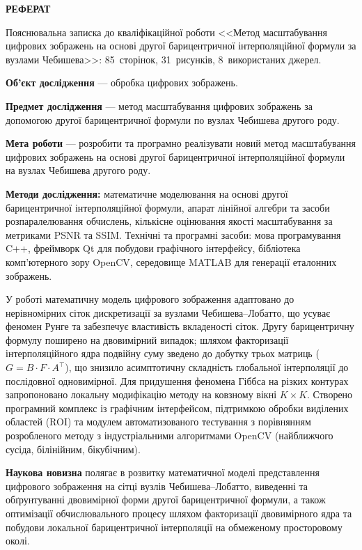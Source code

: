 \begin{center}
	\textbf{РЕФЕРАТ}
\end{center}
Пояснювальна записка до кваліфікаційної роботи <<Метод масштабування цифрових зображень на основі другої барицентричної інтерполяційної формули за вузлами Чебишева>>: 85~сторінок, 31~рисунків, 8~використаних джерел.

\medskip

\textbf{Об'єкт дослідження} --- обробка цифрових зображень. 

\textbf{Предмет дослідження} --- метод масштабування цифрових зображень за допомогою другої барицентричної формули по вузлах Чебишева другого роду.

\textbf{Мета роботи} --- розробити та програмно реалізувати новий метод масштабування цифрових зображень на основі другої барицентричної інтерполяційної формули на вузлах Чебишева другого роду.

\textbf{Методи дослідження:} математичне моделювання на основі другої барицентричної інтерполяційної формули, апарат лінійної алгебри та засоби розпаралелювання обчислень, кількісне оцінювання якості масштабування за метриками PSNR та SSIM. Технічні та програмні засоби: мова програмування C++, фреймворк Qt для побудови графічного інтерфейсу, бібліотека комп'ютерного зору OpenCV, середовище MATLAB для генерації еталонних зображень.

У роботі математичну модель цифрового зображення адаптовано до нерівномірних сіток дискретизації за вузлами Чебишева--Лобатто, що усуває феномен Рунге та забезпечує властивість вкладеності сіток. Другу барицентричну формулу поширено на двовимірний випадок; шляхом факторизації інтерполяційного ядра подвійну суму зведено до добутку трьох матриць ($G = B \cdot F \cdot A^{\top}$), що знизило асимптотичну складність глобальної інтерполяції до послідовної одновимірної. Для придушення феномена Гіббса на різких контурах запропоновано локальну модифікацію методу на ковзному вікні $K \times K$. Створено програмний комплекс із графічним інтерфейсом, підтримкою обробки виділених областей (ROI) та модулем автоматизованого тестування з порівнянням розробленого методу з індустріальними алгоритмами OpenCV (найближчого сусіда, білінійним, бікубічним).

\textbf{Наукова новизна} полягає в розвитку математичної моделі представлення цифрового зображення на сітці вузлів Чебишева--Лобатто, виведенні та обґрунтуванні двовимірної форми другої барицентричної формули, а також оптимізації обчислювального процесу шляхом факторизації двовимірного ядра та побудови локальної барицентричної інтерполяції на обмеженому просторовому околі.

